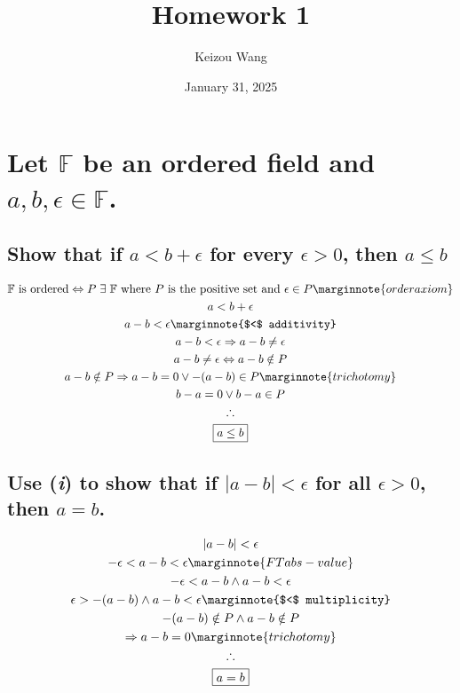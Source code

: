 \documentclass[letterpaper]{article}
\title{Homework 1}
\author{Keizou Wang}
\date{January 31, 2025}
\begin{document}
\maketitle

\section{Let $\mathbb{F}$ be an ordered field and $a, b, \epsilon \in \mathbb{F}$.}
\subsection{Show that if $a < b + \epsilon$ for every $\epsilon > 0$, then $a \leq b$}
\begin{gather*}
\mathbb{F}
\text{ is ordered} \Leftrightarrow
P \hspace{3pt} \exists \hspace{3pt} \mathbb{F}
\text{ where $P$ is the positive set and } \epsilon \in P \marginnote{order axiom} \\
a<b+\epsilon \\
a-b<\epsilon \marginnote{$<$ additivity} \\
a-b<\epsilon \Rightarrow a-b\neq\epsilon \\
a-b\neq\epsilon \Leftrightarrow a-b\notin P \\
a-b\notin P \Rightarrow a-b=0 \lor -(a-b) \in P \marginnote{trichotomy} \\
b-a=0 \lor b-a \in P \\
\therefore \\
\boxed{a \leq b}
\end{gather*}
\subsection{Use (\textit{i}) to show that if $|a-b|<\epsilon$ for all $\epsilon>0$, then $a=b$.}
\begin{gather*}
|a-b|<\epsilon \\
-\epsilon < a-b < \epsilon \marginnote{FT abs-value} \\
-\epsilon < a-b \land a-b < \epsilon \\
\epsilon > -(a-b) \land a-b < \epsilon \marginnote{$<$ multiplicity} \\
-(a-b) \notin P \land a-b \notin P \\
\Rightarrow a-b=0 \marginnote{trichotomy} \\
\therefore \\
\boxed{a = b}
\end{gather*}
\end{document}
